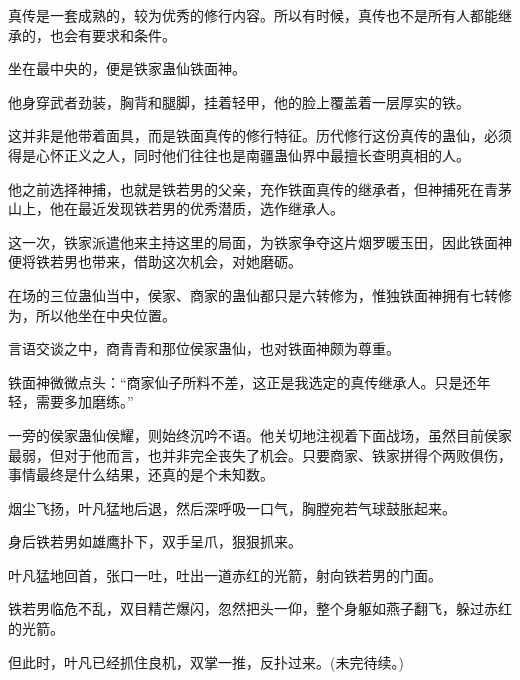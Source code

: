 \begin{this_body}
真传是一套成熟的，较为优秀的修行内容。所以有时候，真传也不是所有人都能继承的，也会有要求和条件。

坐在最中央的，便是铁家蛊仙铁面神。

他身穿武者劲装，胸背和腿脚，挂着轻甲，他的脸上覆盖着一层厚实的铁。

这并非是他带着面具，而是铁面真传的修行特征。历代修行这份真传的蛊仙，必须得是心怀正义之人，同时他们往往也是南疆蛊仙界中最擅长查明真相的人。

他之前选择神捕，也就是铁若男的父亲，充作铁面真传的继承者，但神捕死在青茅山上，他在最近发现铁若男的优秀潜质，选作继承人。

这一次，铁家派遣他来主持这里的局面，为铁家争夺这片烟罗暖玉田，因此铁面神便将铁若男也带来，借助这次机会，对她磨砺。

在场的三位蛊仙当中，侯家、商家的蛊仙都只是六转修为，惟独铁面神拥有七转修为，所以他坐在中央位置。

言语交谈之中，商青青和那位侯家蛊仙，也对铁面神颇为尊重。

铁面神微微点头：“商家仙子所料不差，这正是我选定的真传继承人。只是还年轻，需要多加磨练。”

一旁的侯家蛊仙侯耀，则始终沉吟不语。他关切地注视着下面战场，虽然目前侯家最弱，但对于他而言，也并非完全丧失了机会。只要商家、铁家拼得个两败俱伤，事情最终是什么结果，还真的是个未知数。

烟尘飞扬，叶凡猛地后退，然后深呼吸一口气，胸膛宛若气球鼓胀起来。

身后铁若男如雄鹰扑下，双手呈爪，狠狠抓来。

叶凡猛地回首，张口一吐，吐出一道赤红的光箭，射向铁若男的门面。

铁若男临危不乱，双目精芒爆闪，忽然把头一仰，整个身躯如燕子翻飞，躲过赤红的光箭。

但此时，叶凡已经抓住良机，双掌一推，反扑过来。(未完待续。)

\end{this_body}

